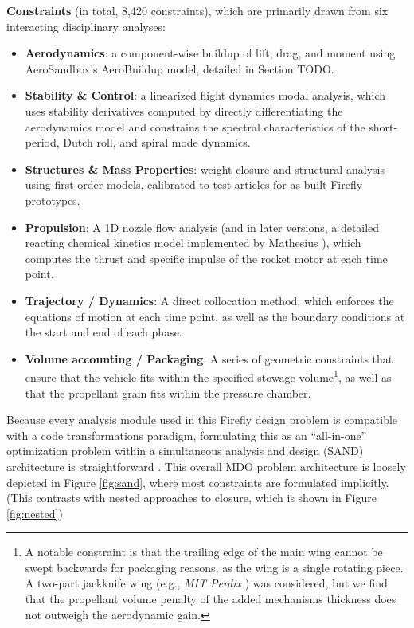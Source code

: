 \begin{example}
\begin{itemize}
        \textbf{Constraints} (in total, 8,420 constraints), which are primarily drawn from six interacting disciplinary analyses:
        \begin{itemize}
            \item \textbf{Aerodynamics}: a component-wise buildup of lift, drag, and moment using AeroSandbox's AeroBuildup model, detailed in Section TODO.
            \item \textbf{Stability \& Control}: a linearized flight dynamics modal analysis, which uses stability derivatives computed by directly differentiating the aerodynamics model and constrains the spectral characteristics of the short-period, Dutch roll, and spiral mode dynamics.
            \item \textbf{Structures \& Mass Properties}: weight closure and structural analysis using first-order models, calibrated to test articles for as-built Firefly prototypes.
            \item \textbf{Propulsion}: A 1D nozzle flow analysis (and in later versions, a detailed reacting chemical kinetics model implemented by Mathesius \cite{mathesius_integrated_2023}), which computes the thrust and specific impulse of the rocket motor at each time point.
            \item \textbf{Trajectory / Dynamics}: A direct collocation method, which enforces the equations of motion at each time point, as well as the boundary conditions at the start and end of each phase.
            \item \textbf{Volume accounting / Packaging}: A series of geometric constraints that ensure that the vehicle fits within the specified stowage volume\footnote{A notable constraint is that the trailing edge of the main wing cannot be swept backwards for packaging reasons, as the wing is a single rotating piece. A two-part jackknife wing (e.g., \emph{MIT Perdix} \cite{tao_design_2012}) was considered, but we find that the propellant volume penalty of the added mechanisms thickness does not outweigh the aerodynamic gain.}, as well as that the propellant grain fits within the pressure chamber.
        \end{itemize}

    \end{itemize}

\end{example}

Because every analysis module used in this Firefly design problem is compatible with a code transformations paradigm, formulating this as an ``all-in-one'' optimization problem within a simultaneous analysis and design (SAND) architecture is straightforward \cite{haftka_simultaneous_1985, martins_multidisciplinary_2013}. This overall MDO problem architecture is loosely depicted in Figure \ref{fig:sand}, where most constraints are formulated implicitly. (This contrasts with nested approaches to closure, which is shown in Figure \ref{fig:nested})

